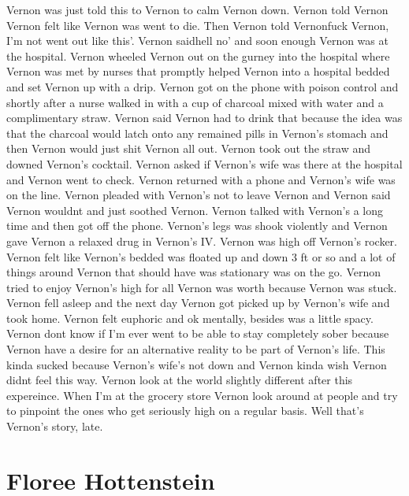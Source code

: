 \documentclass[12pt]{book}
\begin{document}
Vernon was just told this to Vernon to calm Vernon down. Vernon told Vernon Vernon felt like Vernon was went to die. Then Vernon told Vernonfuck Vernon, I'm not went out like this'. Vernon saidhell no' and soon enough Vernon was at the hospital. Vernon wheeled Vernon out on the gurney into the hospital where Vernon was met by nurses that promptly helped Vernon into a hospital bedded and set Vernon up with a drip. Vernon got on the phone with poison control and shortly after a nurse walked in with a cup of charcoal mixed with water and a complimentary straw. Vernon said Vernon had to drink that because the idea was that the charcoal would latch onto any remained pills in Vernon's stomach and then Vernon would just shit Vernon all out. Vernon took out the straw and downed Vernon's cocktail. Vernon asked if Vernon's wife was there at the hospital and Vernon went to check. Vernon returned with a phone and Vernon's wife was on the line. Vernon pleaded with Vernon's not to leave Vernon and Vernon said Vernon wouldnt and just soothed Vernon. Vernon talked with Vernon's a long time and then got off the phone. Vernon's legs was shook violently and Vernon gave Vernon a relaxed drug in Vernon's IV. Vernon was high off Vernon's rocker. Vernon felt like Vernon's bedded was floated up and down 3 ft or so and a lot of things around Vernon that should have was stationary was on the go. Vernon tried to enjoy Vernon's high for all Vernon was worth because Vernon was stuck. Vernon fell asleep and the next day Vernon got picked up by Vernon's wife and took home. Vernon felt euphoric and ok mentally, besides was a little spacy. Vernon dont know if I'm ever went to be able to stay completely sober because Vernon have a desire for an alternative reality to be part of Vernon's life. This kinda sucked because Vernon's wife's not down and Vernon kinda wish Vernon didnt feel this way. Vernon look at the world slightly different after this expereince. When I'm at the grocery store Vernon look around at people and try to pinpoint the ones who get seriously high on a regular basis. Well that's Vernon's story, late.



\chapter{Floree Hottenstein}
\end{document}
